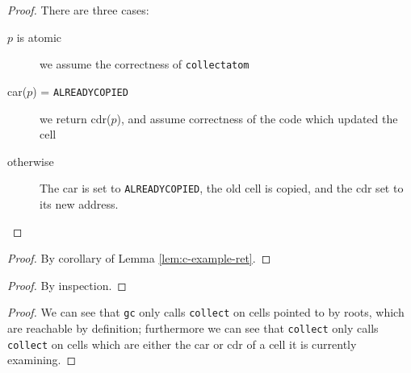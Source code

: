 \begin{lemma}
  \label{lem:c-example-ret}
\end{lemma}

\begin{proof}
  There are three cases:

  \begin{description}
  \item[$p$ is atomic] we assume the correctness of
    \texttt{collectatom}

  \item[car($p$) = \texttt{ALREADYCOPIED}] we return cdr($p$), and
    assume correctness of the code which updated the cell

  \item[otherwise] The car is set to \texttt{ALREADYCOPIED}, the old
    cell is copied, and the cdr set to its new address.
  \end{description}
\end{proof}

\begin{lemma}
  \label{lem:c-example-duplication}
\end{lemma}

\begin{proof}
  By corollary of Lemma \ref{lem:c-example-ret}.
\end{proof}

\begin{lemma}
  \label{lem:c-example-update}
\end{lemma}

\begin{proof}
  By inspection.
\end{proof}

\begin{lemma}
  \label{lem:c-example-unreach}
\end{lemma}

\begin{proof}
  We can see that \texttt{gc} only calls \texttt{collect} on
  cells pointed to by roots, which are reachable by definition;
  furthermore we can see that \texttt{collect} only calls
  \texttt{collect} on cells which are either the car or cdr of a cell
  it is currently examining.
\end{proof}

